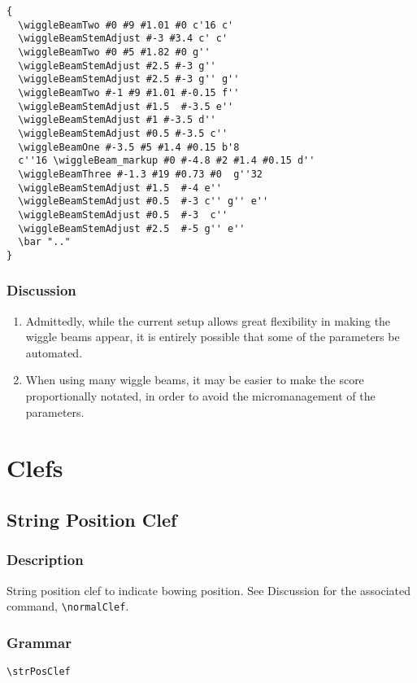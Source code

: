 \documentclass[11pt, oneside]{book}   	%
\begin{document}
\begin{verbatim}
{
  \wiggleBeamTwo #0 #9 #1.01 #0 c'16 c'
  \wiggleBeamStemAdjust #-3 #3.4 c' c'
  \wiggleBeamTwo #0 #5 #1.82 #0 g''
  \wiggleBeamStemAdjust #2.5 #-3 g''
  \wiggleBeamStemAdjust #2.5 #-3 g'' g''
  \wiggleBeamTwo #-1 #9 #1.01 #-0.15 f''
  \wiggleBeamStemAdjust #1.5  #-3.5 e''
  \wiggleBeamStemAdjust #1 #-3.5 d''
  \wiggleBeamStemAdjust #0.5 #-3.5 c''
  \wiggleBeamOne #-3.5 #5 #1.4 #0.15 b'8 
  c''16 \wiggleBeam_markup #0 #-4.8 #2 #1.4 #0.15 d''
  \wiggleBeamThree #-1.3 #19 #0.73 #0  g''32
  \wiggleBeamStemAdjust #1.5  #-4 e''
  \wiggleBeamStemAdjust #0.5  #-3 c'' g'' e''
  \wiggleBeamStemAdjust #0.5  #-3  c''
  \wiggleBeamStemAdjust #2.5  #-5 g'' e''
  \bar ".."
}
\end{verbatim}
\vfill \break

\subsection{Discussion}
\begin{enumerate}
\item Admittedly, while the current setup allows great flexibility in making the wiggle beams appear, it is entirely possible that some of the parameters be automated. 
\item When using many wiggle beams, it may be easier to make the score proportionally notated, in order to avoid the micromanagement of the parameters. 
\end{enumerate}




\chapter {Clefs}


\section {String Position Clef}
\hfill
{}
\hfill

\subsection{Description}
String position clef to indicate bowing position. See Discussion for the associated command, \verb|\normalClef|.

\subsection{Grammar}
\begin{verbatim}
\strPosClef 
\end{verbatim}
\end{document}
